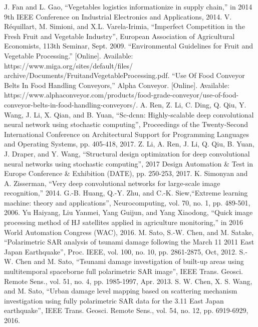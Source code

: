 \documentclass[conference]{IEEEtran}
\begin{document}
	\begin{thebibliography}{00}
		 J. Fan and L. Gao, ``Vegetables logistics informationize in supply chain,'' in 2014 9th IEEE Conference on Industrial Electronics and Applications, 2014.
		 V. Réquillart, M. Simioni, and X.L. Varela-Irimia, ``Imperfect Competition in the Fresh Fruit and Vegetable Industry'', European Association of Agricultural Economists, 113th Seminar, Sept. 2009.
		 ``Environmental Guidelines for Fruit and Vegetable Processing.'' [Online]. Available: https://www.miga.org/sites/default/files/ archive/Documents/FruitandVegetableProcessing.pdf.
		 ``Use Of Food Conveyor Belts In Food Handling Conveyors,'' Alpha Conveyor. [Online]. Available: https://www.alphaconveyor.com/products/food-grade-conveyor/use-of-food-conveyor-belts-in-food-handling-conveyors/.
		 A. Ren, Z. Li, C. Ding, Q. Qiu, Y. Wang, J. Li, X. Qian, and B. Yuan, ``Sc-dcnn: Highly-scalable deep convolutional neural network using stochastic computing'', Proceedings of the Twenty-Second International Conference on Architectural Support for Programming Languages and Operating Systems, pp. 405-418, 2017.
		 Z. Li, A. Ren, J. Li, Q. Qiu, B. Yuan, J. Draper, and Y. Wang, ``Structural design optimization for deep convolutional neural networks using stochastic computing'', 2017 Design Automation \& Test in Europe Conference \& Exhibition (DATE), pp. 250-253, 2017.
		 K. Simonyan and A. Zisserman, ``Very deep convolutional networks for large-scale image recognition,'' 2014.
		 G.-B. Huang, Q.-Y. Zhu, and C.-K. Siew,``Extreme learning machine: theory and applications'', Neurocomputing, vol. 70, no. 1, pp. 489-501, 2006.
		 Yu Haiyang, Liu Yanmei, Yang Guijun, and Yang Xiaodong, ``Quick image processing method of HJ satellites applied in agriculture monitoring,'' in 2016 World Automation Congress (WAC), 2016.
		 M. Sato, S.-W. Chen, and M. Satake, ``Polarimetric SAR analysis of tsunami damage following the March 11 2011 East Japan Earthquake'', Proc. IEEE, vol. 100, no. 10, pp. 2861-2875, Oct, 2012.
		 S.-W. Chen and M. Sato, ``Tsunami damage investigation of built-up areas using multitemporal spaceborne full polarimetric SAR image'', IEEE Trans. Geosci. Remote Sens., vol. 51, no. 4, pp. 1985-1997, Apr. 2013.
		 S. W. Chen, X. S. Wang, and M. Sato, ``Urban damage level mapping based on scattering mechanism investigation using fully polarimetric SAR data for the 3.11 East Japan earthquake'', IEEE Trans. Geosci. Remote Sens., vol. 54, no. 12, pp. 6919-6929, 2016.

\end{thebibliography}
\end{document}
